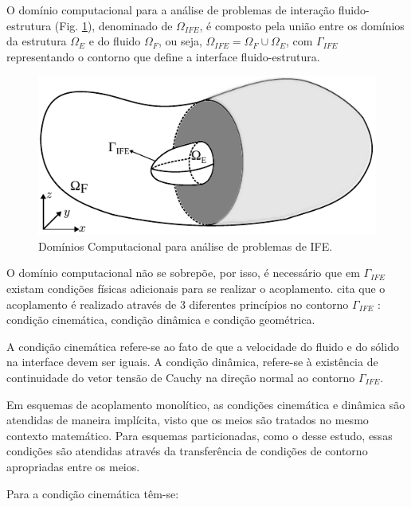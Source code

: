 \documentclass[tese_patricia]{subfiles}
\begin{document}
O domínio computacional para a análise de problemas de interação fluido-estrutura (Fig. \ref{fig:dominios}), denominado de $\Omega_{IFE}$, é composto pela união entre os domínios da estrutura $\Omega_E$ e do fluido $\Omega_F$, ou seja, $\Omega_{IFE} = \Omega_F \cup \Omega_E$, com $\Gamma_{IFE}$ representando o contorno que define a interface fluido-estrutura.

\begin{figure}[htb!]
	\centering 
	\includegraphics[scale=1.0,trim=0cm 0cm 0cm 0.0cm, clip=true]{Imagens/Cap7/dominio.pdf}	
	\caption{Domínios Computacional para análise de problemas de IFE.}
	\label{fig:dominios}
\end{figure}

O domínio computacional não se sobrepõe, por isso, é necessário que em $\Gamma_{IFE}$ existam condições físicas adicionais para se realizar o acoplamento.  cita que o acoplamento é realizado através de 3 diferentes princípios no contorno $\Gamma_{IFE}$ : condição cinemática, condição dinâmica e condição geométrica.

A condição cinemática refere-se ao fato de que a velocidade do fluido e do sólido na interface devem ser iguais. A condição dinâmica, refere-se à existência de continuidade do vetor tensão de Cauchy na direção normal ao contorno $\Gamma_{IFE}$.

Em esquemas de acoplamento monolítico, as condições cinemática e dinâmica são atendidas de maneira implícita, visto que os meios são tratados no mesmo contexto matemático. Para esquemas particionadas, como o desse estudo, essas condições são atendidas através da transferência de condições de contorno apropriadas entre os meios.

Para a condição cinemática têm-se:
\end{document}
